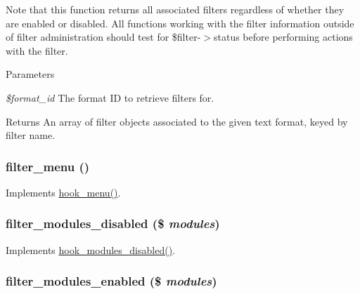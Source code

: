 Note that this function returns all associated filters regardless of whether they are enabled or disabled. All functions working with the filter information outside of filter administration should test for \$filter-\/$>$status before performing actions with the filter.


\begin{DoxyParams}{Parameters}
\item[{\em \$format\_\-id}]The format ID to retrieve filters for.\end{DoxyParams}
\begin{DoxyReturn}{Returns}
An array of filter objects associated to the given text format, keyed by filter name. 
\end{DoxyReturn}
\hypertarget{filter_8module_a13c5612763d7d98499832594ac3d5466}{
\subsubsection[{filter\_\-menu}]{\setlength{\rightskip}{0pt plus 5cm}filter\_\-menu ()}}
\label{filter_8module_a13c5612763d7d98499832594ac3d5466}
Implements \hyperlink{group__hooks_ga5c95244fea59b25666e409759e133ded}{hook\_\-menu()}. \hypertarget{filter_8module_a7e24767aad57c1c96b57d58a12afef56}{
\subsubsection[{filter\_\-modules\_\-disabled}]{\setlength{\rightskip}{0pt plus 5cm}filter\_\-modules\_\-disabled (\$ {\em modules})}}
\label{filter_8module_a7e24767aad57c1c96b57d58a12afef56}
Implements \hyperlink{group__hooks_ga591c577fba8ca8dc8ec17f8bf80bdc4c}{hook\_\-modules\_\-disabled()}. \hypertarget{filter_8module_ac9fcc24aa485e1c24fa1abf036dea521}{
\subsubsection[{filter\_\-modules\_\-enabled}]{\setlength{\rightskip}{0pt plus 5cm}filter\_\-modules\_\-enabled (\$ {\em modules})}}
